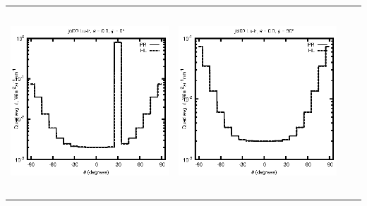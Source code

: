 \begin{tabular}{c c c c}
\includegraphics[height=7cm]{../eps/jol00_Lu_ir_fwd.eps} &
\includegraphics[height=7cm]{../eps/jol00_Lu_ir_cross.eps} \\
\end{tabular}

\pagebreak

